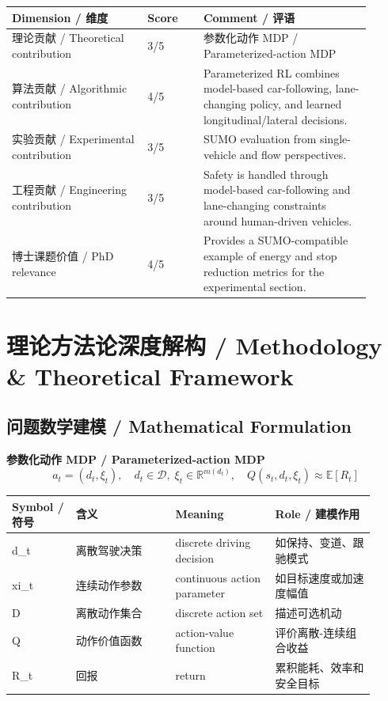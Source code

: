 \documentclass[UTF8,a4paper,11pt,fontset=fandol]{ctexart}
\begin{document}
\begin{longtable}{p{0.34\linewidth}p{0.14\linewidth}p{0.42\linewidth}}
\toprule
Dimension / 维度 & Score & Comment / 评语\\
\midrule
理论贡献 / Theoretical contribution & 3/5 & 参数化动作 MDP / Parameterized-action MDP \\
算法贡献 / Algorithmic contribution & 4/5 & Parameterized RL combines model-based car-following, lane-changing policy, and learned longitudinal/lateral decisions. \\
实验贡献 / Experimental contribution & 3/5 & SUMO evaluation from single-vehicle and flow perspectives. \\
工程贡献 / Engineering contribution & 3/5 & Safety is handled through model-based car-following and lane-changing constraints around human-driven vehicles. \\
博士课题价值 / PhD relevance & 4/5 & Provides a SUMO-compatible example of energy and stop reduction metrics for the experimental section. \\
\bottomrule
\end{longtable}

\section{理论方法论深度解构 / Methodology \& Theoretical Framework}
\subsection{问题数学建模 / Mathematical Formulation}
\textbf{参数化动作 MDP / Parameterized-action MDP}
\[
a_t=(d_t,\xi_t),\quad d_t\in\mathcal{D},\;\xi_t\in\mathbb{R}^{m(d_t)},\quad Q(s_t,d_t,\xi_t)\approx \mathbb{E}[R_t]
\]
\begin{longtable}{p{0.16\linewidth}p{0.25\linewidth}p{0.25\linewidth}p{0.25\linewidth}}
\toprule
Symbol / 符号 & 含义 & Meaning & Role / 建模作用\\
\midrule
d\_t & 离散驾驶决策 & discrete driving decision & 如保持、变道、跟驰模式 \\
xi\_t & 连续动作参数 & continuous action parameter & 如目标速度或加速度幅值 \\
D & 离散动作集合 & discrete action set & 描述可选机动 \\
Q & 动作价值函数 & action-value function & 评价离散-连续组合收益 \\
R\_t & 回报 & return & 累积能耗、效率和安全目标 \\
\bottomrule
\end{longtable}
\end{document}
